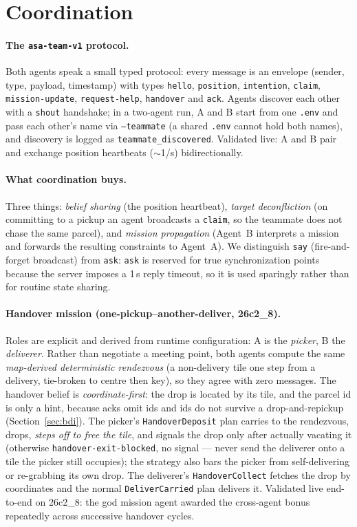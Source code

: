 \section{Coordination}
\label{sec:coord}

\paragraph{The \texttt{asa-team-v1} protocol.} Both agents speak a small typed
protocol: every message is an envelope (sender, type, payload, timestamp) with
types \texttt{hello}, \texttt{position}, \texttt{intention}, \texttt{claim},
\texttt{mission-update}, \texttt{request-help}, \texttt{handover} and
\texttt{ack}. Agents discover each other with a \texttt{shout} handshake; in a
two-agent run, A and B start from one \texttt{.env} and pass each other's name
via \texttt{--teammate} (a shared \texttt{.env} cannot hold both names), and
discovery is logged as \texttt{teammate\_discovered}. Validated live: A and B
pair and exchange position heartbeats ($\sim$1/s) bidirectionally.

\paragraph{What coordination buys.} Three things: \emph{belief sharing} (the
position heartbeat), \emph{target deconfliction} (on committing to a pickup an
agent broadcasts a \texttt{claim}, so the teammate does not chase the same
parcel), and \emph{mission propagation} (Agent~B interprets a mission and
forwards the resulting constraints to Agent~A). We distinguish \texttt{say}
(fire-and-forget broadcast) from \texttt{ask}: \texttt{ask} is reserved for true
synchronization points because the server imposes a 1\,s reply timeout, so it is
used sparingly rather than for routine state sharing.

\paragraph{Handover mission (one-pickup--another-deliver, 26c2\_8).} Roles are
explicit and derived from runtime configuration: A is the \emph{picker}, B the
\emph{deliverer}. Rather than negotiate a meeting point, both agents compute the
same \emph{map-derived deterministic rendezvous} (a non-delivery tile one step
from a delivery, tie-broken to centre then key), so they agree with zero
messages. The handover belief is \emph{coordinate-first}: the drop is located by
its tile, and the parcel id is only a hint, because acks omit ids and ids do not
survive a drop-and-repickup (Section~\ref{sec:bdi}). The picker's
\texttt{HandoverDeposit} plan carries to the rendezvous, drops, \emph{steps off
to free the tile}, and signals the drop only after actually vacating it
(otherwise \texttt{handover-exit-blocked}, no signal --- never send the
deliverer onto a tile the picker still occupies); the strategy also bars the
picker from self-delivering or re-grabbing its own drop. The deliverer's
\texttt{HandoverCollect} fetches the drop by coordinates and the normal
\texttt{DeliverCarried} plan delivers it. Validated live end-to-end on 26c2\_8:
the god mission agent awarded the cross-agent bonus repeatedly across successive
handover cycles.

